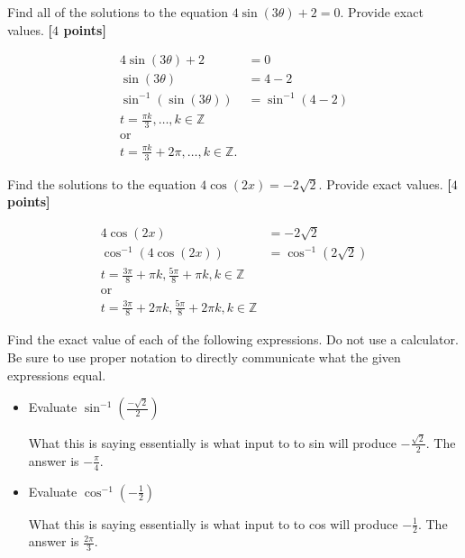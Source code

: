 \begin{problem}
  Find all of the solutions to the equation $4\sin(3\theta) + 2 = 0$. Provide
  exact values. \textbf{[$4$ points]}
\end{problem}

\begin{solution}
  \begin{align*}
    4\sin(3\theta) + 2 &= 0 \\
    \sin(3\theta) &= 4 - 2 \\
    \sin^{-1} (\sin(3\theta)) &= \sin^{-1} (4 - 2) \\
    t = \frac{\pi k}{3}, \ldots, k \in \mathbb{Z} \\
    \textrm{or} \\
    t = \frac{\pi k}{3} + 2\pi, \ldots, k \in \mathbb{Z}
  .\end{align*}
\end{solution}

\newpage

\begin{problem}
  Find the solutions to the equation $4\cos(2x) = -2\sqrt{2}$. Provide exact
  values. \textbf{[$4$ points]}
\end{problem}

\begin{solution}
  \begin{align*}
    4\cos(2x) &= -2\sqrt{2} \\
    \cos^{-1} (4\cos(2x)) &= \cos^{-1} (2\sqrt{2}) \\
    t = \frac{3\pi}{8} + \pi k, \frac{5\pi}{8} + \pi k, k \in \mathbb{Z} \\
    \textrm{or} \\
    t = \frac{3\pi}{8} + 2\pi k, \frac{5\pi}{8} + 2\pi k, k \in \mathbb{Z}
  \end{align*}
\end{solution}

\newpage

Find the exact value of each of the following expressions. Do not use a
calculator. Be sure to use proper notation to directly communicate what the
given expressions equal.

\begin{itemize}
  \item Evaluate $\sin^{-1} (\frac{-\sqrt{2}}{2})$

    What this is saying essentially is what input to to sin will produce
    $-\frac{\sqrt{2}}{2}$. The answer is $-\frac{\pi}{4}$.
  \item Evaluate $\cos^{-1} (-\frac{1}{2})$ 

    What this is saying essentially is what input to to cos will produce
    $-\frac{1}{2}$. The answer is $\frac{2\pi}{3}$.
\end{itemize}
